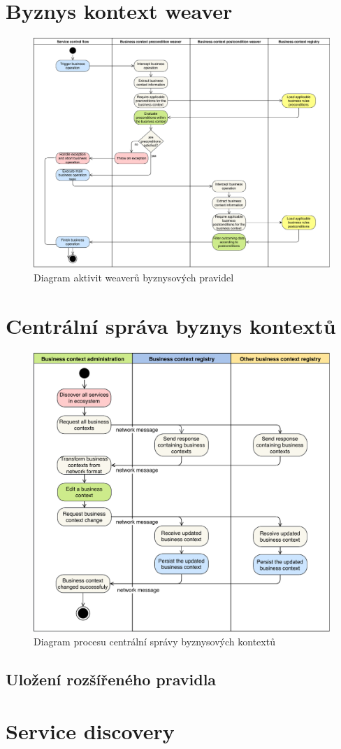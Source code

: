 \section{Byznys kontext weaver}

\begin{figure}
    \centering
    \includegraphics[keepaspectratio=true, width=0.8\linewidth]{figures/business-rules-weaver.pdf}
    \caption{Diagram aktivit weaverů byznysových pravidel}
    \label{fig:business-rules-weaver}
\end{figure} %

\section{Centrální správa byznys kontextů}

\begin{figure}
    \centering
    \includegraphics[keepaspectratio=true, width=0.8\linewidth]{figures/business-context-management.pdf}
    \caption{Diagram procesu centrální správy byznysových kontextů}
    \label{fig:business-context-management}
\end{figure} %

\subsection{Uložení rozšířeného pravidla}


\section{Service discovery}

